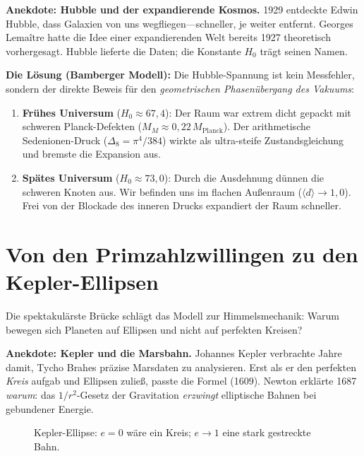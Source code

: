 \documentclass[11pt,a4paper]{article}
\newcommand{\Mplanck}{M_{\text{Planck}}}
\begin{document}
\medskip
\noindent\textbf{Anekdote: Hubble und der expandierende Kosmos.} 1929 entdeckte Edwin Hubble, dass Galaxien von uns wegfliegen---schneller, je weiter entfernt. Georges Lemaître hatte die Idee einer expandierenden Welt bereits 1927 theoretisch vorhergesagt. Hubble lieferte die Daten; die Konstante $H_0$ trägt seinen Namen.

\textbf{Die Lösung (Bamberger Modell):} Die Hubble-Spannung ist kein Messfehler, sondern der direkte Beweis für den \emph{geometrischen Phasenübergang des Vakuums}:

\begin{enumerate}
  \item \textbf{Frühes Universum} ($H_0 \approx 67{,}4$): Der Raum war extrem dicht gepackt mit schweren Planck-Defekten ($M_M \approx 0{,}22\,\Mplanck$). Der arithmetische Sedenionen-Druck ($\Delta_8 = \pi^4/384$) wirkte als ultra-steife Zustandsgleichung und bremste die Expansion aus.

  \item \textbf{Spätes Universum} ($H_0 \approx 73{,}0$): Durch die Ausdehnung dünnen die schweren Knoten aus. Wir befinden uns im flachen Außenraum ($\langle d \rangle \to 1{,}0$). Frei von der Blockade des inneren Drucks expandiert der Raum schneller.
\end{enumerate}

\section{Von den Primzahlzwillingen zu den Kepler-Ellipsen}

Die spektakulärste Brücke schlägt das Modell zur Himmelsmechanik: Warum bewegen sich Planeten auf Ellipsen und nicht auf perfekten Kreisen?

\medskip
\noindent\textbf{Anekdote: Kepler und die Marsbahn.} Johannes Kepler verbrachte Jahre damit, Tycho Brahes präzise Marsdaten zu analysieren. Erst als er den perfekten \emph{Kreis} aufgab und Ellipsen zuließ, passte die Formel (1609). Newton erklärte 1687 \emph{warum}: das $1/r^2$-Gesetz der Gravitation \emph{erzwingt} elliptische Bahnen bei gebundener Energie.

\begin{figure}[htbp]
  \centering
  \caption{Kepler-Ellipse: $e=0$ wäre ein Kreis; $e \to 1$ eine stark gestreckte Bahn.}
\end{figure}
\end{document}
